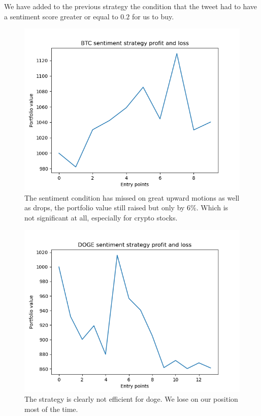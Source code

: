 \documentclass[twoside]{report}
\begin{document}
\begin{spacing}{1}
\vspace{-1.5em}
\begin{strategy}
We have added to the previous strategy the condition that the tweet had to have a sentiment score greater or equal to $0.2$ for us to buy.\end{strategy}\label{strat:sent} 
\begin{figure}[!htbp]
    \centering
    \includegraphics[scale = 0.5]{TestPlots/plot_sentiment_btc.png}
    \caption{The sentiment condition has missed on great upward motions as well as drops, the portfolio value still raised but only by 6\%. Which is not significant at all, especially for crypto stocks.}
    \label{}
\end{figure}
\begin{figure}[!htbp]
    \centering
    \includegraphics[scale = 0.5]{TestPlots/Doge_sentiment_plot.png}
    \caption{The strategy is clearly not efficient for doge. We lose on our position most of the time. }
    \label{}
\end{figure}


\end{spacing}
\end{document}
